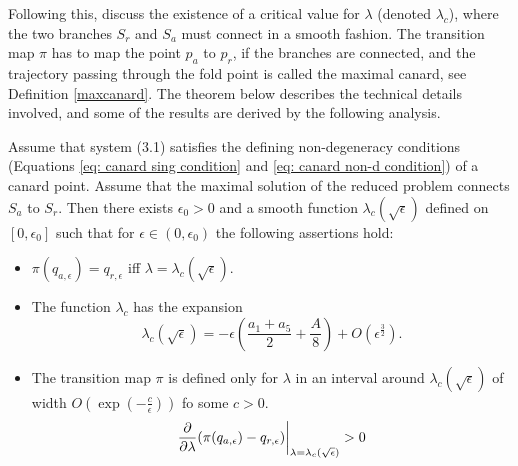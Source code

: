 Following this, \citet{krupa2001} discuss the existence of a critical value for $\lambda$ (denoted $\lambda_c$), where the two branches $S_r$ and $S_a$ must connect in a smooth fashion.  
The transition map $\pi$ has to map the point $p_a$ to $p_r$, if the branches are connected, and the trajectory passing through the fold point is called the maximal canard, see Definition \ref{maxcanard}.
The theorem below describes the technical details involved, and some of the results are derived by the following analysis.
\begin{theorem}
	Assume that system (3.1) satisfies the defining non-degeneracy conditions (Equations \ref{eq: canard sing condition} and \ref{eq: canard non-d condition}) of a canard point. Assume that the maximal solution of the reduced problem connects $ S_a $ to $ S_r $. Then there exists $ \epsilon_0 > 0 $ and a smooth function $\lambda_c(\sqrt{\epsilon})$ defined on $ [0, \epsilon_0] $ such that for $\epsilon \in (0, \epsilon_0)$ the following assertions hold:
	\begin{itemize}
		\item $ \pi(q_{a,\epsilon})=q_{r,\epsilon} $ iff $ \lambda=\lambda_c(\sqrt{\epsilon}) $.
		\item The function $ \lambda_c $ has the expansion
		 \begin{equation*}
			\lambda_c(\sqrt{\epsilon})=-\epsilon\left(\frac{a_1+a_5}{2}+\frac{A}{8}\right)+O\left(\epsilon^\frac{3}{2}\right).
   		 \end{equation*}
			\item The transition map $\pi$ is defined only for $\lambda$ in an interval around $ \lambda_c(\sqrt{\epsilon}) $ of width $ O(\exp(-\frac{c}{\epsilon})) $ fo some $ c>0 $.
			$$ \pd{}{\lambda}(\pi(q_{a,\epsilon})-q_{r,\epsilon})\bigg|_{\lambda=\lambda_c(\sqrt{\epsilon})}>0  $$
	\end{itemize}
\label{Theorem 3.1}
\end{theorem}
%



